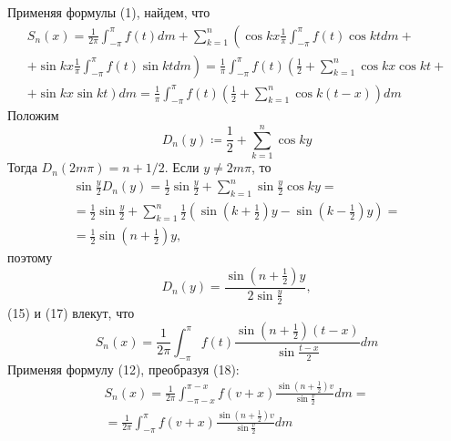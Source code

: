 \documentclass[main]{subfiles}
\begin{document}
Применяя формулы (1), найдем, что
\begin{multline*}
    S_n(x) = \frac{1}{2 \pi} \int_{-\pi}^{\pi} f(t) dm + \sum_{k=1}^{n} \left(\cos kx \frac{1}{\pi} \int_{-\pi}^{\pi} f(t) \cos kt dm + \right. \\
    \left. + \sin kx \frac{1}{\pi} \int_{-\pi}^{\pi} f(t) \sin kt dm\right) = \frac{1}{\pi} \int_{-\pi}^{\pi} f(t) \left( \frac{1}{2} + \sum_{k=1}^{n} \cos kx \cos kt + \right. \\
    \left. + \sin kx \sin kt\right) dm = \frac{1}{\pi} \int_{-\pi}^{\pi} f(t) \left( \frac{1}{2} + \sum_{k=1}^{n} \cos k(t-x) \right) dm \tag{15}
\end{multline*}
Положим
\[D_n(y) \coloneq \frac{1}{2} + \sum_{k=1}^{n} \cos ky \tag{16}\]
Тогда $D_n(2 m \pi) = n + 1/2$.
Если $y \neq 2 m \pi$, то
\begin{multline*}
    \sin \frac{y}{2} D_n(y) = \frac{1}{2} \sin \frac{y}{2} + \sum_{k=1}^{n} \sin \frac{y}{2} \cos ky = \\
    = \frac{1}{2} \sin \frac{y}{2} + \sum_{k=1}^{n} \frac{1}{2}\left( \sin \left(k + \frac{1}{2}\right)y - \sin \left(k - \frac{1}{2}\right)y\right) = \\
    = \frac{1}{2} \sin \left(n + \frac{1}{2}\right)y,
\end{multline*}
поэтому
\[D_n(y) = \frac{\sin \left(n + \frac{1}{2}\right)y}{2 \sin \frac{y}{2}}, \tag{17}\]
(15) и (17) влекут, что
\[S_n(x) = \frac{1}{2\pi} \int_{-\pi}^{\pi} f(t) \frac{\sin \left(n + \frac{1}{2}\right)(t-x)}{\sin \frac{t-x}{2}} dm \tag{18}\]
Применяя формулу (12), преобразуя (18):
\begin{multline*}
    S_n(x) = \frac{1}{2\pi} \int_{-\pi - x}^{\pi - x} f(v + x) \frac{\sin \left(n + \frac{1}{2}\right)v}{\sin \frac{v}{2}} dm = \\
    = \frac{1}{2\pi} \int_{-\pi}^{\pi} f(v + x) \frac{\sin \left(n + \frac{1}{2}\right)v}{\sin \frac{v}{2}} dm \tag{19}
\end{multline*}
\end{document}
